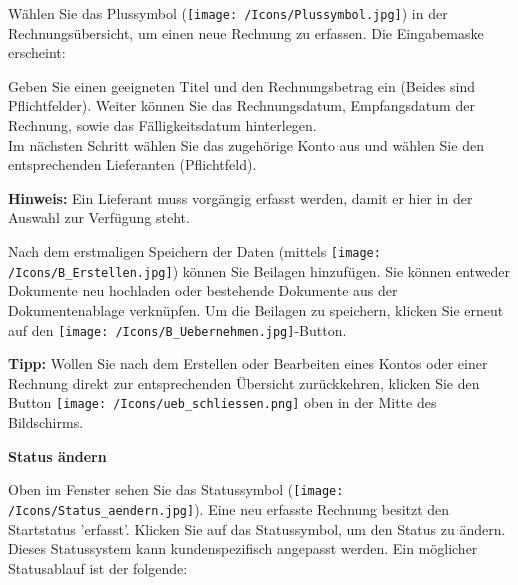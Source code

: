 Wählen Sie das Plussymbol (\texttt{[image: /Icons/Plussymbol.jpg]}) in der Rechnungsübersicht, um einen neue Rechnung zu erfassen. Die Eingabemaske erscheint:
 
\vspace{6cm}

Geben Sie einen geeigneten Titel und den Rechnungsbetrag ein (Beides sind Pflichtfelder). Weiter können Sie das Rechnungsdatum, Empfangsdatum der Rechnung, sowie das Fälligkeitsdatum hinterlegen. \\
Im nächsten Schritt wählen Sie das zugehörige Konto aus und wählen Sie den entsprechenden Lieferanten (Pflichtfeld).

\vspace{\baselineskip}

\textbf{Hinweis:} Ein Lieferant muss vorgängig erfasst werden, damit er hier in der Auswahl zur Verfügung steht.

\vspace{\baselineskip}

Nach dem erstmaligen Speichern der Daten (mittels \texttt{[image: /Icons/B\_Erstellen.jpg]}) können Sie Beilagen hinzufügen. Sie können entweder Dokumente neu hochladen oder bestehende Dokumente aus der Dokumentenablage verknüpfen. Um die Beilagen zu speichern, klicken Sie erneut auf den \texttt{[image: /Icons/B\_Uebernehmen.jpg]}-Button. 

\vspace{\baselineskip}

\textbf{Tipp:} Wollen Sie nach dem Erstellen oder Bearbeiten eines Kontos oder einer Rechnung direkt zur entsprechenden Übersicht zurückkehren, klicken Sie den Button \texttt{[image: /Icons/ueb\_schliessen.png]} oben in der Mitte des Bildschirms.

\vspace{\baselineskip}

\pagebreak
\textbf{Status ändern}

\vspace{\baselineskip}

Oben im Fenster sehen Sie das Statussymbol (\texttt{[image: /Icons/Status\_aendern.jpg]}). Eine neu erfasste Rechnung besitzt den Startstatus 'erfasst'. Klicken Sie auf das Statussymbol, um den Status zu ändern. Dieses Statussystem kann kundenspezifisch angepasst werden. Ein möglicher Statusablauf ist der folgende:

